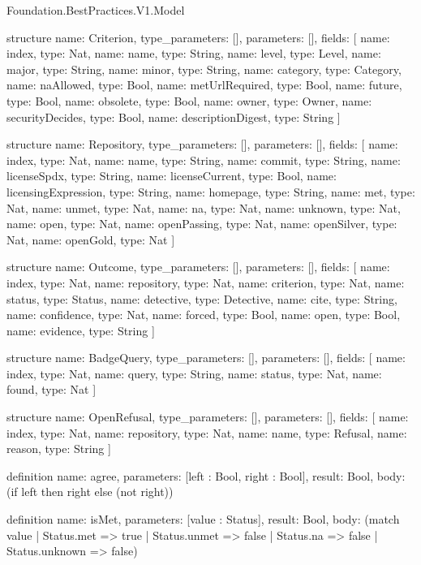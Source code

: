 \begin{lexlean}{Foundation.BestPractices.V1.Model}
\begin{semanticmodule}
structure{
  name: Criterion,
  type_parameters: [],
  parameters: [],
  fields: [
    {name: index, type: Nat},
    {name: name, type: String},
    {name: level, type: Level},
    {name: major, type: String},
    {name: minor, type: String},
    {name: category, type: Category},
    {name: naAllowed, type: Bool},
    {name: metUrlRequired, type: Bool},
    {name: future, type: Bool},
    {name: obsolete, type: Bool},
    {name: owner, type: Owner},
    {name: securityDecides, type: Bool},
    {name: descriptionDigest, type: String}
  ]
}

structure{
  name: Repository,
  type_parameters: [],
  parameters: [],
  fields: [
    {name: index, type: Nat},
    {name: name, type: String},
    {name: commit, type: String},
    {name: licenseSpdx, type: String},
    {name: licenseCurrent, type: Bool},
    {name: licensingExpression, type: String},
    {name: homepage, type: String},
    {name: met, type: Nat},
    {name: unmet, type: Nat},
    {name: na, type: Nat},
    {name: unknown, type: Nat},
    {name: open, type: Nat},
    {name: openPassing, type: Nat},
    {name: openSilver, type: Nat},
    {name: openGold, type: Nat}
  ]
}

structure{
  name: Outcome,
  type_parameters: [],
  parameters: [],
  fields: [
    {name: index, type: Nat},
    {name: repository, type: Nat},
    {name: criterion, type: Nat},
    {name: status, type: Status},
    {name: detective, type: Detective},
    {name: cite, type: String},
    {name: confidence, type: Nat},
    {name: forced, type: Bool},
    {name: open, type: Bool},
    {name: evidence, type: String}
  ]
}

structure{
  name: BadgeQuery,
  type_parameters: [],
  parameters: [],
  fields: [
    {name: index, type: Nat},
    {name: query, type: String},
    {name: status, type: Nat},
    {name: found, type: Nat}
  ]
}

structure{
  name: OpenRefusal,
  type_parameters: [],
  parameters: [],
  fields: [
    {name: index, type: Nat},
    {name: repository, type: Nat},
    {name: name, type: Refusal},
    {name: reason, type: String}
  ]
}

definition{
  name: agree,
  parameters: [left : Bool, right : Bool],
  result: Bool,
  body: (if left then right else (not right))
}

definition{
  name: isMet,
  parameters: [value : Status],
  result: Bool,
  body: (match value
    | Status.met => true
    | Status.unmet => false
    | Status.na => false
    | Status.unknown => false)
}


\end{semanticmodule}
\end{lexlean}
